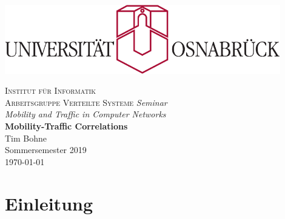 \documentclass[12pt, a4paper]{article}
\begin{document}

\begin{titlepage}
\centering
\thispagestyle{empty}
\begin{center}
\includegraphics[width=0.9\textwidth]{uos.pdf}
\end{center}
\LARGE{\textsc{Institut für Informatik\\Arbeitsgruppe Verteilte Systeme}}
\vfill
\LARGE{\emph{Seminar}}\\
\LARGE{\emph{Mobility and Traffic in Computer Networks}}\\
\vspace{8mm}
\huge{\textbf{{\selectfont
Mobility-Traffic Correlations}}}\\
\vspace{9mm}
\LARGE{Tim Bohne}\\
\vspace{0.2cm}
\vspace{4cm}
\large{Sommersemester 2019}\\
\vspace{0.2cm}
\large{\today}
\vfill
\end{titlepage}
\newpage

\tableofcontents
\newpage

\pagestyle{plain}

\section{Einleitung}
\end{document}
